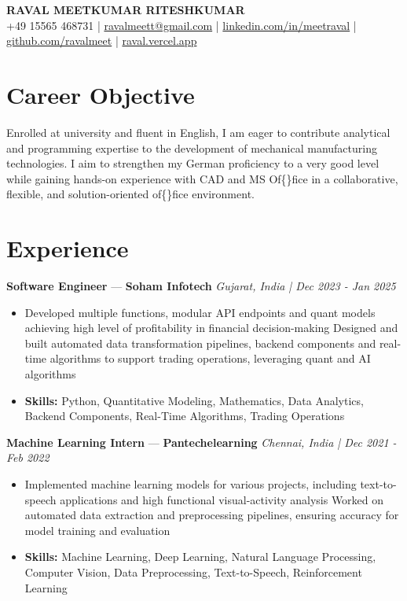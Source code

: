 \documentclass[a4paper,10pt]{article}
\begin{document}
\begin{center}
  {\Large\bfseries RAVAL MEETKUMAR RITESHKUMAR}\\[2pt]
  {\small +49 15565 468731 \;|\; \href{mailto:ravalmeett@gmail.com}{ravalmeett@gmail.com} \;|\; \href{https://www.linkedin.com/in/meetraval/}{linkedin.com/in/meetraval} \;|\; \href{https://github.com/ravalmeet}{github.com/ravalmeet} \;|\; \href{https://raval.vercel.app/}{raval.vercel.app}}
\end{center}
\vspace{-3pt}

\section*{Career Objective}
Enrolled at university and fluent in English, I am eager to contribute analytical and programming expertise to the development of mechanical manufacturing technologies. I aim to strengthen my German proficiency to a very good level while gaining hands-on experience with CAD and MS Of\{\}fice in a collaborative, flexible, and solution-oriented of\{\}fice environment.\par

\section*{Experience}
\textbf{Software Engineer} — \textbf{Soham Infotech} \hfill \textit{Gujarat, India \;|\; Dec 2023 - Jan 2025}\par
\vspace{1pt}
\begin{itemize}
  \item Developed multiple functions, modular API endpoints and quant models achieving high level of profitability in financial decision-making Designed and built automated data transformation pipelines, backend components and real-time algorithms to support trading operations, leveraging quant and AI algorithms
  \item \textbf{Skills:} Python, Quantitative Modeling, Mathematics, Data Analytics, Backend Components, Real-Time Algorithms, Trading Operations
\end{itemize}
\vspace{3pt}
\textbf{Machine Learning Intern} — \textbf{Pantechelearning} \hfill \textit{Chennai, India \;|\; Dec 2021 - Feb 2022}\par
\vspace{1pt}
\begin{itemize}
  \item Implemented machine learning models for various projects, including text-to-speech applications and high functional visual-activity analysis Worked on automated data extraction and preprocessing pipelines, ensuring accuracy for model training and evaluation
  \item \textbf{Skills:} Machine Learning, Deep Learning, Natural Language Processing, Computer Vision, Data Preprocessing, Text-to-Speech, Reinforcement Learning
\end{itemize}
\end{document}
